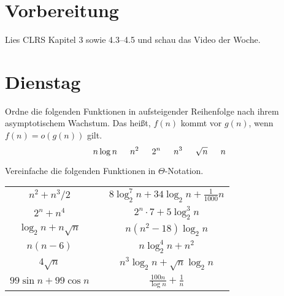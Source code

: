 \documentclass{uebung_cs}
\begin{document}
\section*{Vorbereitung}
Lies CLRS Kapitel 3 sowie 4.3--4.5 und schau das Video der Woche.

\section*{Dienstag}
\begin{aufgabe}\label{tue-first}\mbox{}
	Ordne die folgenden Funktionen in aufsteigender Reihenfolge nach ihrem asymptotischem Wachstum.
	Das heißt, $f(n)$ kommt vor $g(n)$, wenn $f(n) = o(g(n))$ gilt.
	\[n \log n\hspace*{15pt} n^2\hspace*{15pt} 2^n\hspace*{15pt} n^3\hspace*{15pt} \sqrt{n}\hspace*{15pt} n\]
\end{aufgabe}

\begin{aufgabe}
	Vereinfache die folgenden Funktionen in $\Theta$-Notation.
	\begin{center}
		\begin{tabular}{ccc}
			$n^2 + n^3/2$
			&&
			$8\log_2^7 n + 34\log_2 n + \frac{1}{1000}n$\\
			$2^n + n^4$&&
			$2^n\cdot 7 + 5\log_2^3 n$\\
			$\log_2n + n\sqrt{n}$&&
			$n(n^2 - 18)\log_2 n$\\
			$n(n-6)$&&
			$n\log_2^4 n + n^2$\\
			$4\sqrt{n}$&&
			$n^3 \log_2 n + \sqrt{n}\log_2 n$\\
			$99\sin n + 99\cos n$&& $\frac{100n}{\log n}+\frac{1}{n}$
		\end{tabular}
	\end{center}
	
\end{aufgabe}
\end{document}
